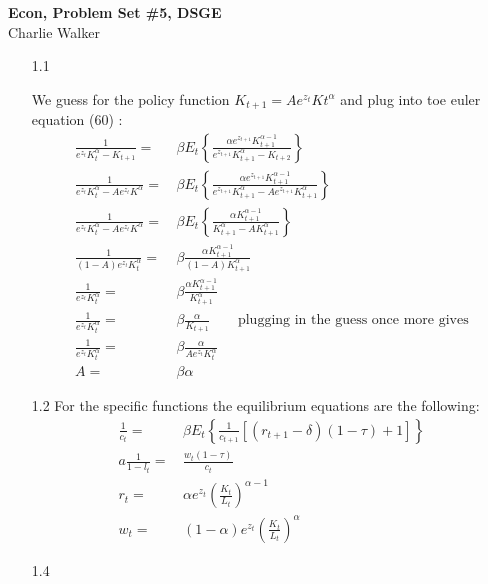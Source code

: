 \documentclass[letterpaper,12pt]{article}
\theoremstyle{definition}
\begin{document}
\begin{flushleft}
   \textbf{\large{Econ, Problem Set \#5, DSGE}} \\[5pt] Charlie Walker \\[5pt]
\end{flushleft}

\begin{enumerate}
\item[1.1] 

We guess for the policy function $K_{t+1} = Ae^{z_t}Kt^{\alpha}$ and plug into toe euler equation (60) :
\begin{align*}
\frac{1}{e^{z_t}K_t^{\alpha} - K_{t+1}} =&\,  \beta E_t \left\lbrace \frac{\alpha e^{z_{t+1}}K_{t+1}^{\alpha -1}}{e^{z_{t+1}}K_{t+1}^{\alpha} - K_{t+2}} 
\right\rbrace\\
\frac{1}{e^{z_t}K_t^{\alpha} - Ae^{z_t}K^{\alpha}} =&\,  \beta E_t \left\lbrace \frac{\alpha e^{z_{t+1}}K_{t+1}^{\alpha -1}}{e^{z_{t+1}}K_{t+1}^{\alpha} - Ae^{z_{t+1}}K_{t+1}^{\alpha}} \right\rbrace\\
\frac{1}{e^{z_t}K_t^{\alpha} - Ae^{z_t}K^{\alpha}} =&\,  \beta E_t \left\lbrace \frac{\alpha K_{t+1}^{\alpha -1}}{K_{t+1}^{\alpha} - AK_{t+1}^{\alpha}} \right\rbrace\\
\frac{1}{(1 - A)e^{z_t}K_t^{\alpha}} =&\,  \beta  \frac{\alpha K_{t+1}^{\alpha -1}}{(1 - A)K_{t+1}^{\alpha}}\\
\frac{1}{e^{z_t}K_t^{\alpha}} =&\,  \beta  \frac{\alpha K_{t+1}^{\alpha -1}}{K_{t+1}^{\alpha}}\\
\frac{1}{e^{z_t}K_t^{\alpha}} =&\,  \beta  \frac{\alpha}{K_{t+1}} 
\qquad \text{plugging in the guess once more gives}\\
\frac{1}{e^{z_t}K_t^{\alpha}} =&\,  \beta  \frac{\alpha}{Ae^{z_t}K_t^{\alpha}} \\
A=&\, \beta \alpha
\end{align*}
\item[1.2]
For the specific functions the equilibrium equations are the following:
\begin{align*}
\frac{1}{c_t} = &\, \beta E_t \left\lbrace \frac{1}{c_{t+1}}[(r_{t+1} - \delta)(1-\tau)+1] \right\rbrace \\
a \frac{1}{1-l_t} = &\, \frac{w_t(1-\tau)}{c_t}\\
r_t=&\,\alpha e^{z_t} \left( \frac{K_t}{L_t} \right)^{\alpha-1}\\
w_t = &\, (1-\alpha) e^{z_t} \left( \frac{K_t}{L_t} \right)^{\alpha}
\end{align*}
\item[1.4]

\end{enumerate}
\end{document}
